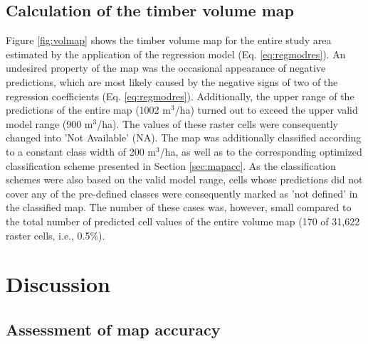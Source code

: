 \subsection{Calculation of the timber volume map}
\label{sec:mapcalc}

Figure \ref{fig:volmap} shows the timber volume map for the entire study area estimated by the application of the regression model (Eq. \ref{eq:regmodres}). An undesired property of the map was the occasional appearance of negative predictions, which are most likely caused by the negative signs of two of the regression coefficients (Eq. \ref{eq:regmodres}). Additionally, the upper range of the predictions of the entire map (1002 m$^3$/ha) turned out to exceed the upper valid model range (900 m$^3$/ha). The values of these raster cells were consequently changed into 'Not Available' (NA). The map was additionally classified according to a constant class width of 200 m$^3$/ha, as well as to the corresponding optimized classification scheme presented in Section \ref{sec:mapacc}. As the classification schemes were also based on the valid model range, cells whose predictions did not cover any of the pre-defined classes were consequently marked as 'not defined' in the classified map. The number of these cases was, however, small compared to the total number of predicted cell values of the entire volume map (170 of 31,622 raster cells, i.e., 0.5\%).


\section{Discussion}
\label{sec:disc}

\subsection{Assessment of map accuracy}
\label{sec:mapaccass}

